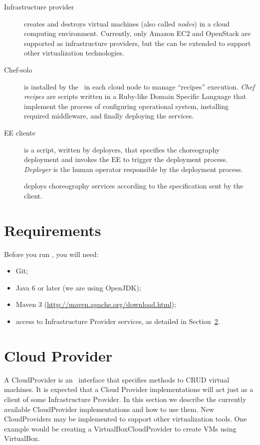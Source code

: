 \begin{description}

\item [Infrastructure provider] creates and destroys virtual machines (also called \emph{nodes}) in a cloud computing environment. Currently, only Amazon EC2 and OpenStack are supported as infrastructure providers, but the \ee can be extended to support other virtualization technologies.

\item [Chef-solo] is installed by the \ee\ in each cloud node to manage ``recipes'' execution. \emph{Chef recipes} are scripts written in a Ruby-like Domain Specific Language that implement the process of configuring operational system, installing required middleware, and finally deploying the services.

\item [EE cliente] is a script, written by deployers, that specifies the choreography deployment
and invokes the EE to trigger the deployment process.
\emph{Deployer} is the human operator responsible by the deployment process. 

\item [\ee] deploys choreography services according to the specification sent by the client.

\end{description} 



\section{Requirements}

Before you run \ee, you will need:

\begin{itemize}
\item Git;
\item Java 6 or later (we are using OpenJDK);
\item Maven 3  (\url{http://maven.apache.org/download.html});
\item access to Infrastructure Provider services, as detailed in Section~\ref{sec:cloud}.
\end{itemize}

\section{Cloud Provider}
\label{sec:cloud}

A \textsf{CloudProvider} is an \ee\ interface that specifies methods to CRUD virtual machines. It is expected that a \textsf{Cloud Provider} implementations will act just as a client of some Infrastructure Provider. In this section we describe the currently available \textsf{CloudProvider} implementations and how to use them. New \textsf{CloudProvider}s may be implemented to support other virtualization tools. One example would be creating a \textsf{VirtualBoxCloudProvider} to create VMs using VirtualBox.

